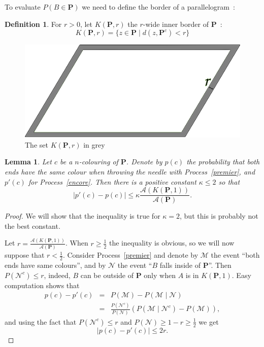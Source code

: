 \documentclass[a4paper,11pt]{article}
\newtheorem{lemma}{Lemma}
\theoremstyle{definition}
\newtheorem{definition}{Definition}
\theoremstyle{remark}
\begin{document}
To evaluate $P(B \in \mathbf{P})$ we need to define the border of a parallelogram~:
\begin{definition}
For $r>0$, let $K(\mathbf{P},r)$ the $r$-wide inner border of $\mathbf{P}$~:
\[K(\mathbf{P},r) = \{ z \in \mathbf{P} \mid d(z,\mathbf{P}^c) < r\} \] 
\end{definition}

\begin{figure}[h]
\center
\includegraphics[scale=0.5]{tablefinie.png}
\caption{\label{tablefinie} The set $K(\mathbf{P},r)$ in grey}
\end{figure}

\begin{lemma}
Let $c$ be a $n$-colouring of $\mathbf{P}$. Denote by $p(c)$ the probability 
that both ends have the same colour when throwing 
the needle with Process~\ref{premier}, and $p'(c)$ for Process~\ref{encore}. Then 
there is a positive constant $\kappa \leq 2$ so that 
$$ | p'(c) - p(c)| \leq \kappa \frac{\mathcal{A}(K(\mathbf{P},1))}{\mathcal{A}(\mathbf{P})}.$$
\end{lemma}

\begin{proof}
We will show that the inequality is true for $\kappa =2$, but this is probably 
not the best constant.

Let $r = \frac{\mathcal{A}(K(\mathbf{P},1))}{\mathcal{A}(\mathbf{P})}$. When 
$r \geq \frac12$ the inequality is obvious, so we will now suppose that 
$r < \frac12$. Consider Process~\ref{premier} and denote by $\mathcal{M}$ the 
event ``both ends have same colours'', and by $\mathcal{N}$ the event ``$B$ 
falls inside of $\mathbf{P}$''. Then $P(\mathcal{N}^c) \leq r$, indeed, $B$ can 
be outside of $\mathbf{P}$ only
when $A$ is in $K(\mathbf{P},1)$. Easy computation shows that
\begin{eqnarray*}
p(c) - p'(c) & = & P(\mathcal{M}) - P(\mathcal{M} \mid \mathcal{N}) \\
& = & \frac{P(\mathcal{N}^c)}{P(\mathcal{N})} \left( P(\mathcal{M}\mid \mathcal{N}^c) - P(\mathcal{M})\right),
\end{eqnarray*}
and using the fact that $P(\mathcal{N}^c) \leq r$ and 
$P(\mathcal{N}) \geq 1-r \geq \frac12$ we get 
$$ |p(c) - p'(c)| \leq 2r.$$
\end{proof}
\end{document}
